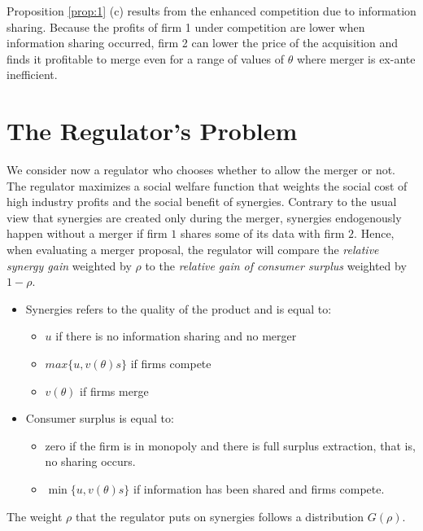 \documentclass[a4paper,leqno]{article}%
\renewcommand{\t}{\theta}
\begin{document}
\medskip

Proposition \ref{prop:1} (c) results from the enhanced competition due to information sharing. Because the profits of firm 1 under competition are lower when information sharing occurred, firm 2 can lower the price of the acquisition and finds it profitable to merge even for a range of values of $\t$ where merger is ex-ante inefficient.

\medskip

\section{The Regulator's Problem}

We consider now a regulator who chooses whether to allow the merger or not. The regulator maximizes a social welfare function that weights the social cost of high industry profits and the social benefit of synergies. Contrary to the usual view that synergies are created only during the merger, synergies endogenously happen without a merger if firm $1$ shares some of its data with firm $2$. Hence, when evaluating a merger proposal, the regulator will compare the \emph{relative synergy gain} weighted by $\rho$ to the \emph{relative gain of consumer surplus} weighted by $1-\rho$.


\begin{itemize}
    \item Synergies refers to the quality of the product and is equal to:
    \begin{itemize}
        \item $u$ if there is no information sharing and no merger
        \item $max\{u,v(\t)s\}$ if firms compete
        \item $v(\t)$ if firms merge
    \end{itemize}
    \item Consumer surplus is equal to:
    \begin{itemize}
        \item zero if the firm is in monopoly and there is full surplus extraction, that is, no sharing occurs.
        \item $\min\{u,v(\t)s\}$ if information has been shared and firms compete.
    \end{itemize}
\end{itemize}

The weight $\rho$ that the regulator puts on synergies follows a distribution $G(\rho)$.
\end{document}
